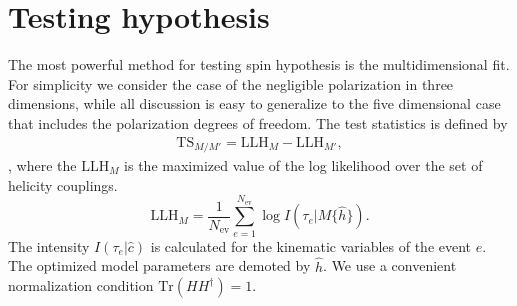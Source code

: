 \documentclass[prd,preprintnumbers,floatfix,
nofootinbib,superscriptaddress]{revtex4}
\newcommand{\diff}{\mathrm{d}}
\newcommand{\TS}{\mathrm{TS}}
\newcommand{\LLH}{\mathrm{LLH}}
\newcommand{\I}{\ensuremath{I}}
\newcommand{\II}{\ensuremath{{I\!I}}}
\newcommand{\III}{\ensuremath{{I\!I\!I}}}
\newcommand{\IV}{\ensuremath{{I\!V}}}
\begin{document}

%


\section{Testing hypothesis} \label{sec:test.statistics}
The most powerful method for testing spin hypothesis is the multidimensional fit.
For simplicity we consider the case of the negligible polarization in three dimensions, while all discussion is easy to generalize to the five dimensional case that includes
the polarization degrees of freedom.
The test statistics is defined by
\begin{align} \label{eq:test.statistics}
  \TS_{M/M'} = \LLH_M - \LLH_{M'},
\end{align},
where the $\LLH_M$ is the maximized value of the log likelihood over the set of helicity couplings.
\begin{equation} \label{eq:likelihood}
  \LLH_M = \frac{1}{N_\mathrm{ev}} \sum_{e=1}^{N_\mathrm{ev}} \log I(\tau_e|M\{\hat{h}\}).
\end{equation}
The intensity $I(\tau_e|\hat{c})$ is calculated for the kinematic variables of the event $e$.
The optimized model parameters are demoted by $\hat{h}$. We use a convenient normalization condition $\mathrm{Tr}(HH^\dagger) = 1$.
\end{document}
